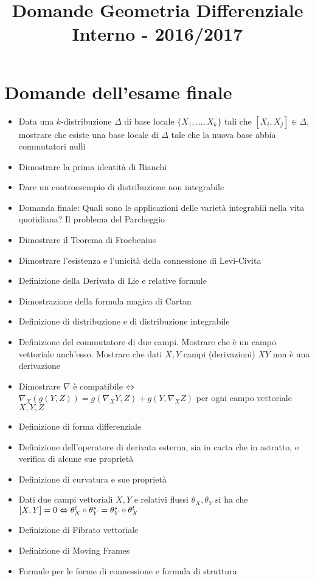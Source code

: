 \documentclass[a4paper,NoNotes,GeneralMath]{stdmdoc}
\begin{document}
\title{Domande Geometria Differenziale Interno - 2016/2017}

\section*{Domande dell'esame finale}
\begin{itemize}
\item Data una $k$-distribuzione $\Delta$ di base locale $\{X_1, \ldots, X_k\}$ tali che $[X_i, X_j] \in \Delta$, mostrare che esiste una base locale di $\Delta$ tale che la nuova base abbia commutatori nulli
\item Dimostrare la prima identità di Bianchi
\item Dare un controesempio di distribuzione non integrabile
\item Domanda finale: Quali sono le applicazioni delle varietà integrabili nella vita quotidiana? Il problema del Parcheggio
\item Dimostrare il Teorema di Froebenius
\item Dimostrare l'esistenza e l'unicità della connessione di Levi-Civita
\item Definizione della Derivata di Lie e relative formule
\item Dimostrazione della formula magica di Cartan
\item Definizione di distribuzione e di distribuzione integrabile
\item Definizione del commutatore di due campi. Mostrare che è un campo vettoriale anch'esso. Mostrare che dati $X, Y$ campi (derivazioni) $XY$ non è una derivazione
\item Dimostrare $\nabla$ è compatibile $\Leftrightarrow$ $\nabla_X (g(Y, Z)) = g(\nabla_X Y, Z) + g(Y, \nabla_X Z)$ per ogni campo vettoriale $X, Y, Z$
\item Definizione di forma differenziale
\item Definizione dell'operatore di derivata esterna, sia in carta che in astratto, e verifica di alcune sue proprietà
\item Definizione di curvatura e sue proprietà
\item Dati due campi vettoriali $X, Y$ e relativi flussi $\theta_X, \theta_Y$ si ha che $[X, Y] = 0 \Leftrightarrow \theta_X^{t} \circ \theta_Y^{s} = \theta_Y^{s} \circ \theta_X^{t}$
\item Definizione di Fibrato vettoriale
\item Definizione di Moving Frames
\item Formule per le forme di connessione e formula di struttura

\end{itemize}
\end{document}
